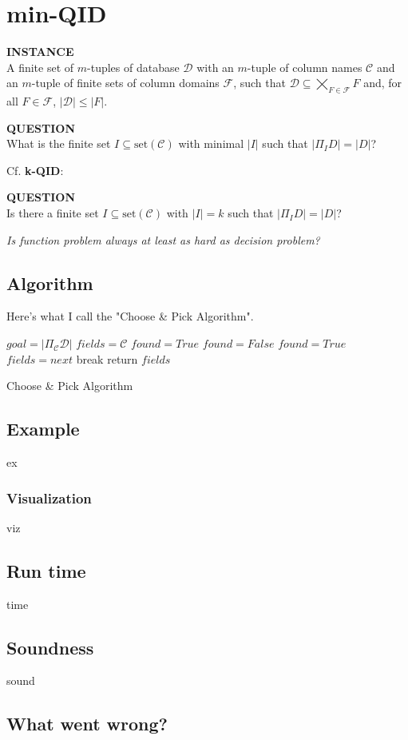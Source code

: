 \documentclass[12pt]{article}
\begin{document}

\section*{min-QID}
\textbf{INSTANCE}\\A finite set of $m$-tuples of database $\mathcal{D}$ with an $m$-tuple of column names $\mathcal{C}$ and an $m$-tuple of finite sets of column domains $\mathcal{F}$, such that $\mathcal{D} \subseteq \bigtimes_{F \in \mathcal{F}} F$ and, for all $F \in \mathcal{F}$, $|\mathcal{D}| \leq |F|$.

\noindent\textbf{QUESTION}\\What is the finite set $I \subseteq \mathrm{set}(\mathcal{C})$ with minimal $|I|$ such that $|\Pi_{I} D| = |D|$?

Cf. \textbf{k-QID}:

\noindent\textbf{QUESTION}\\Is there a finite set $I \subseteq \mathrm{set}(\mathcal{C})$ with $|I| = k$ such that $|\Pi_{I} D| = |D|$?

\begin{center}\emph{Is function problem always at least as hard as decision problem?}\end{center}

\subsection*{Algorithm}
Here's what I call the "Choose \& Pick Algorithm".\\
\begin{algorithm}[H]
    \DontPrintSemicolon
    $goal = |\Pi_{\mathcal{C}} \mathcal{D}|$\;
    $fields = \mathcal{C}$\;
    $found = True$\;
    {
        $found = False$\;
        {
            {
                $found = True$\;
                $fields = next$\;
                break\;
            }
        }
    }
    return $fields$\;
\caption{Choose \& Pick Algorithm}
\end{algorithm}

\subsection*{Example}
ex

\subsubsection*{Visualization}
viz

\subsection*{Run time}
time

\subsection*{Soundness}
sound

\subsection*{What went wrong?}
\end{document}
